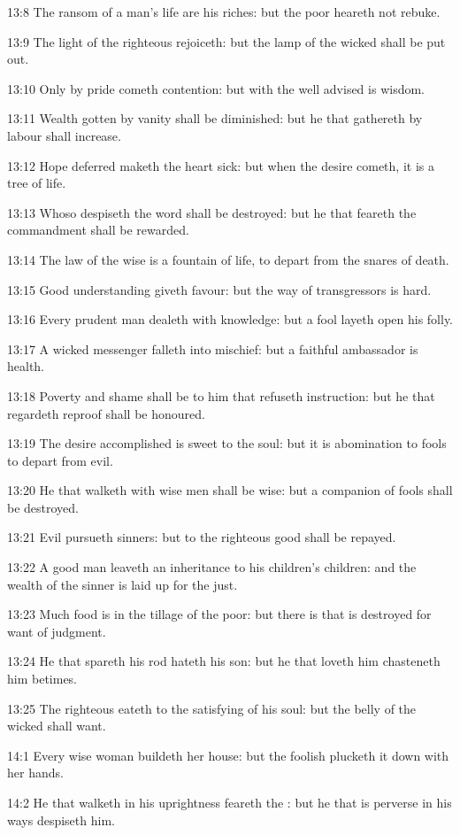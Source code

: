 13:8 The ransom of a man's life are his riches: but the poor heareth
not rebuke.

13:9 The light of the righteous rejoiceth: but the lamp of the wicked
shall be put out.

13:10 Only by pride cometh contention: but with the well advised is
wisdom.

13:11 Wealth gotten by vanity shall be diminished: but he that
gathereth by labour shall increase.

13:12 Hope deferred maketh the heart sick: but when the desire cometh,
it is a tree of life.

13:13 Whoso despiseth the word shall be destroyed: but he that feareth
the commandment shall be rewarded.

13:14 The law of the wise is a fountain of life, to depart from the
snares of death.

13:15 Good understanding giveth favour: but the way of transgressors
is hard.

13:16 Every prudent man dealeth with knowledge: but a fool layeth open
his folly.

13:17 A wicked messenger falleth into mischief: but a faithful
ambassador is health.

13:18 Poverty and shame shall be to him that refuseth instruction: but
he that regardeth reproof shall be honoured.

13:19 The desire accomplished is sweet to the soul: but it is
abomination to fools to depart from evil.

13:20 He that walketh with wise men shall be wise: but a companion of
fools shall be destroyed.

13:21 Evil pursueth sinners: but to the righteous good shall be
repayed.

13:22 A good man leaveth an inheritance to his children's children:
and the wealth of the sinner is laid up for the just.

13:23 Much food is in the tillage of the poor: but there is that is
destroyed for want of judgment.

13:24 He that spareth his rod hateth his son: but he that loveth him
chasteneth him betimes.

13:25 The righteous eateth to the satisfying of his soul: but the
belly of the wicked shall want.

14:1 Every wise woman buildeth her house: but the foolish plucketh it
down with her hands.

14:2 He that walketh in his uprightness feareth the \LORD: but he that
is perverse in his ways despiseth him.

